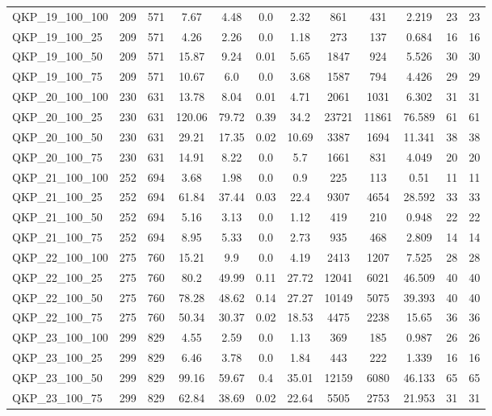 \begin{table}[!h]
{\begin{tabular}{lccccccccccc}
QKP\_19\_100\_100 & 209 & 571 & 7.67 & 4.48 & 0.0 & 2.32 & 861 & 431 & 2.219 & 23 & 23\\
QKP\_19\_100\_25 & 209 & 571 & 4.26 & 2.26 & 0.0 & 1.18 & 273 & 137 & 0.684 & 16 & 16\\
QKP\_19\_100\_50 & 209 & 571 & 15.87 & 9.24 & 0.01 & 5.65 & 1847 & 924 & 5.526 & 30 & 30\\
QKP\_19\_100\_75 & 209 & 571 & 10.67 & 6.0 & 0.0 & 3.68 & 1587 & 794 & 4.426 & 29 & 29\\
QKP\_20\_100\_100 & 230 & 631 & 13.78 & 8.04 & 0.01 & 4.71 & 2061 & 1031 & 6.302 & 31 & 31\\
QKP\_20\_100\_25 & 230 & 631 & 120.06 & 79.72 & 0.39 & 34.2 & 23721 & 11861 & 76.589 & 61 & 61\\
QKP\_20\_100\_50 & 230 & 631 & 29.21 & 17.35 & 0.02 & 10.69 & 3387 & 1694 & 11.341 & 38 & 38\\
QKP\_20\_100\_75 & 230 & 631 & 14.91 & 8.22 & 0.0 & 5.7 & 1661 & 831 & 4.049 & 20 & 20\\
QKP\_21\_100\_100 & 252 & 694 & 3.68 & 1.98 & 0.0 & 0.9 & 225 & 113 & 0.51 & 11 & 11\\
QKP\_21\_100\_25 & 252 & 694 & 61.84 & 37.44 & 0.03 & 22.4 & 9307 & 4654 & 28.592 & 33 & 33\\
QKP\_21\_100\_50 & 252 & 694 & 5.16 & 3.13 & 0.0 & 1.12 & 419 & 210 & 0.948 & 22 & 22\\
QKP\_21\_100\_75 & 252 & 694 & 8.95 & 5.33 & 0.0 & 2.73 & 935 & 468 & 2.809 & 14 & 14\\
QKP\_22\_100\_100 & 275 & 760 & 15.21 & 9.9 & 0.0 & 4.19 & 2413 & 1207 & 7.525 & 28 & 28\\
QKP\_22\_100\_25 & 275 & 760 & 80.2 & 49.99 & 0.11 & 27.72 & 12041 & 6021 & 46.509 & 40 & 40\\
QKP\_22\_100\_50 & 275 & 760 & 78.28 & 48.62 & 0.14 & 27.27 & 10149 & 5075 & 39.393 & 40 & 40\\
QKP\_22\_100\_75 & 275 & 760 & 50.34 & 30.37 & 0.02 & 18.53 & 4475 & 2238 & 15.65 & 36 & 36\\
QKP\_23\_100\_100 & 299 & 829 & 4.55 & 2.59 & 0.0 & 1.13 & 369 & 185 & 0.987 & 26 & 26\\
QKP\_23\_100\_25 & 299 & 829 & 6.46 & 3.78 & 0.0 & 1.84 & 443 & 222 & 1.339 & 16 & 16\\
QKP\_23\_100\_50 & 299 & 829 & 99.16 & 59.67 & 0.4 & 35.01 & 12159 & 6080 & 46.133 & 65 & 65\\
QKP\_23\_100\_75 & 299 & 829 & 62.84 & 38.69 & 0.02 & 22.64 & 5505 & 2753 & 21.953 & 31 & 31\\

\end{tabular}}
\end{table}
